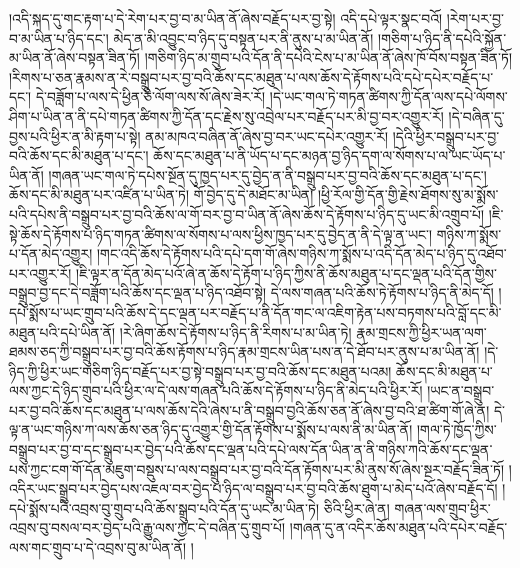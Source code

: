 །འདི་སྐད་དུ་གང་རྟག་པ་དེ་རེག་པར་བྱ་བ་མ་ཡིན་ནོ་ཞེས་བརྗོད་པར་བྱ་སྟེ། འདི་དཔེ་ལྟར་སྣང་བའོ། །རེག་པར་བྱ་བ་མ་ཡིན་པ་ཉིད་དང་། མེད་ན་མི་འབྱུང་བ་ཉིད་དུ་བསྟན་པར་ནི་ནུས་པ་མ་ཡིན་ནོ། །གཅིག་པ་ཉིད་ནི་དཔེའི་སྐྱོན་མ་ཡིན་ནོ་ཞེས་བསྟན་ཟིན་ཏོ། །གཅིག་ཉིད་མ་གྲུབ་པའི་དོན་ནི་དཔེའི་ངེས་པ་མ་ཡིན་ནོ་ཞེས་ཁོ་བོས་བསྟན་ཟིན་ཏོ། །རིགས་པ་ཅན་རྣམས་ན་རེ་བསྒྲུབ་པར་བྱ་བའི་ཆོས་དང་མཐུན་པ་ལས་ཆོས་དེ་རྟོགས་པའི་དཔེ་དཔེར་བརྗོད་པ་དང་། དེ་བཟློག་པ་ལས་དེ་ཕྱིན་ཅི་ལོག་ལས་སོ་ཞེས་ཟེར་རོ། །དེ་ཡང་གལ་ཏེ་གཏན་ཚིགས་ཀྱི་དོན་ལས་དཔེ་ལོགས་ཤིག་པ་ཡིན་ན་ནི་དཔེ་གཏན་ཚིགས་ཀྱི་དོན་དང་རྗེས་སུ་འབྲེལ་པར་བརྗོད་པར་མི་བྱ་བར་འགྱུར་རོ། །དེ་བཞིན་དུ་བྱས་པའི་ཕྱིར་ན་མི་རྟག་པ་སྟེ། ནམ་མཁའ་བཞིན་ནོ་ཞེས་བྱ་བར་ཡང་དཔེར་འགྱུར་རོ། །དེའི་ཕྱིར་བསྒྲུབ་པར་བྱ་བའི་ཆོས་དང་མི་མཐུན་པ་དང་། ཆོས་དང་མཐུན་པ་ནི་ཡོད་པ་དང་མཉན་བྱ་ཉིད་དག་ལ་སོགས་པ་ལ་ཡང་ཡོད་པ་ཡིན་ནོ། །གཞན་ཡང་གལ་ཏེ་དཔེས་སྔོན་དུ་ཁྱད་པར་དུ་བྱེད་ན་ནི་བསྒྲུབ་པར་བྱ་བའི་ཆོས་དང་མཐུན་པ་དང་། ཆོས་དང་མི་མཐུན་པར་འཛིན་པ་ཡིན་ཏེ། གོ་བྱེད་དུ་དེ་མཐོང་མ་ཡིན། །ཕྱི་རོལ་གྱི་དོན་གྱི་རྗེས་ཐོགས་སུ་མ་སྨོས་པའི་དཔེས་ནི་བསྒྲུབ་པར་བྱ་བའི་ཆོས་ལ་གོ་བར་བྱ་བ་ཡིན་ནོ་ཞེས་ཆོས་དེ་རྟོགས་པ་ཉིད་དུ་ཡང་མི་འགྲུབ་པོ། །ཇི་སྟེ་ཆོས་དེ་རྟོགས་པ་ཉིད་གཏན་ཚིགས་ལ་སོགས་པ་ལས་ཕྱིས་ཁྱད་པར་དུ་བྱེད་ན་ནི་དེ་ལྟ་ན་ཡང་། གཉིས་ཀ་སྨོས་པ་དོན་མེད་འགྱུར། །གང་འདི་ཆོས་དེ་རྟོགས་པའི་དཔེ་དག་གོ་ཞེས་གཉིས་ཀ་སྨོས་པ་འདི་དོན་མེད་པ་ཉིད་དུ་འཐོབ་པར་འགྱུར་རོ། །ཇི་ལྟར་ན་དོན་མེད་པའོ་ཞེ་ན་ཆོས་དེ་རྟོག་པ་ཉིད་ཀྱིས་ནི་ཆོས་མཐུན་པ་དང་ལྡན་པའི་དོན་གྱིས་བསྒྲུབ་བྱ་དང་དེ་བཟློག་པའི་ཆོས་དང་ལྡན་པ་ཉིད་འཐོབ་སྟེ། དེ་ལས་གཞན་པའི་ཆོས་ཏེ་རྟོགས་པ་ཉིད་ནི་མེད་དོ། །དཔེ་སྨོས་པ་ཡང་གྲུབ་པའི་ཆོས་དེ་དང་ལྡན་པར་བརྗོད་པ་ནི་དོན་གང་ལ་འཇིག་རྟེན་པས་བཏགས་པའི་བློ་དང་མི་མཐུན་པའི་དཔེ་ཡིན་ནོ། །རེ་ཞིག་ཆོས་དེ་རྟོགས་པ་ཉིད་ནི་རིགས་པ་མ་ཡིན་ཏེ། རྣམ་གྲངས་ཀྱི་ཕྱིར་ཡན་ལག་ཐམས་ཅད་ཀྱི་བསྒྲུབ་པར་བྱ་བའི་ཆོས་རྟོགས་པ་ཉིད་རྣམ་གྲངས་ཡིན་པས་ན་དེ་ཐོབ་པར་ནུས་པ་མ་ཡིན་ནོ། །དེ་ཉིད་ཀྱི་ཕྱིར་ཡང་གཅིག་ཉིད་བརྗོད་པར་བྱ་སྟེ་བསྒྲུབ་པར་བྱ་བའི་ཆོས་དང་མཐུན་པའམ། ཆོས་དང་མི་མཐུན་པ་ལས་ཀྱང་དེ་ཉིད་གྲུབ་པའི་ཕྱིར་ལ་དེ་ལས་གཞན་པའི་ཆོས་དེ་རྟོགས་པ་ཉིད་ནི་མེད་པའི་ཕྱིར་རོ། །ཡང་ན་བསྒྲུབ་པར་བྱ་བའི་ཆོས་དང་མཐུན་པ་ལས་ཆོས་དེའི་ཞེས་པ་ནི་བསྒྲུབ་བྱའི་ཆོས་ཅན་ནོ་ཞེས་བྱ་བའི་ཐ་ཚིག་གོ་ཞེ་ན། དེ་ལྟ་ན་ཡང་གཉིས་ཀ་ལས་ཆོས་ཅན་ཉིད་དུ་འགྱུར་གྱི་དོན་རྟོགས་པ་སྨོས་པ་ལས་ནི་མ་ཡིན་ནོ། །གལ་ཏེ་ཁྱོད་ཀྱིས་བསྒྲུབ་པར་བྱ་བ་དང་སྒྲུབ་པར་བྱེད་པའི་ཆོས་དང་ལྡན་པའི་དཔེ་ལས་དོན་ཡིན་ན་ནི་གཉིས་ཀའི་ཆོས་དང་ལྡན་པས་ཀྱང་ངག་གོ་དོན་མཇུག་བསྡུས་པ་ལས་བསྒྲུབ་པར་བྱ་བའི་དོན་རྟོགས་པར་མི་ནུས་སོ་ཞེས་སྔར་བརྗོད་ཟིན་ཏོ། །འདིར་ཡང་སྒྲུབ་པར་བྱེད་པས་འཇལ་བར་བྱེད་པ་ཉིད་ལ་བསྒྲུབ་པར་བྱ་བའི་ཆོས་ཐུག་པ་མེད་པའོ་ཞེས་བརྗོད་དོ། །དཔེ་སྨོས་པའི་འབྲས་བུ་གྲུབ་པའི་ཆོས་སྒྲུབ་པའི་དོན་དུ་ཡང་མ་ཡིན་ཏེ། ཅིའི་ཕྱིར་ཞེ་ན། གཞན་ལས་གྲུབ་ཕྱིར་འབྲས་བུ་བསལ་བར་བྱེད་པའི་རྒྱུ་ལས་ཀྱང་དེ་བཞིན་དུ་གྲུབ་པོ། །གཞན་དུ་ན་འདིར་ཆོས་མཐུན་པའི་དཔེར་བརྗོད་ལས་གང་གྲུབ་པ་དེ་འབྲས་བུ་མ་ཡིན་ནོ། །
